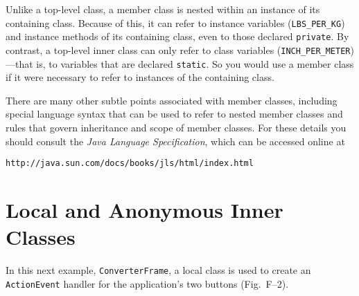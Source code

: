Unlike a top-level class, a member class is nested within an instance
of its containing class.  Because of this, it can refer to instance
variables (\verb|LBS_PER_KG|) and instance methods of its containing
class, even to those declared {\tt private}. By contrast, a top-level
inner class can only refer to class variables (\verb|INCH_PER_METER|)---that 
is, to variables that are declared {\tt static}. So you would
use a member class if it were necessary to refer to instances of the
containing class.

There are many other subtle points associated with member classes,
including special language syntax that can be used to refer to
nested member classes and rules that govern inheritance and scope
of member classes.  For these details you should consult the
{\it Java Language Specification}, which can be accessed online
at

\begin{jjjlisting}
\begin{lstlisting}[commentstyle=\color{black}]
http://java.sun.com/docs/books/jls/html/index.html
\end{lstlisting}
\end{jjjlisting}


\section*{Local and Anonymous Inner Classes}

In this next example, {\tt ConverterFrame}, a local class is used to
create an {\tt ActionEvent} handler for the application's two buttons
(Fig.~F--2).

